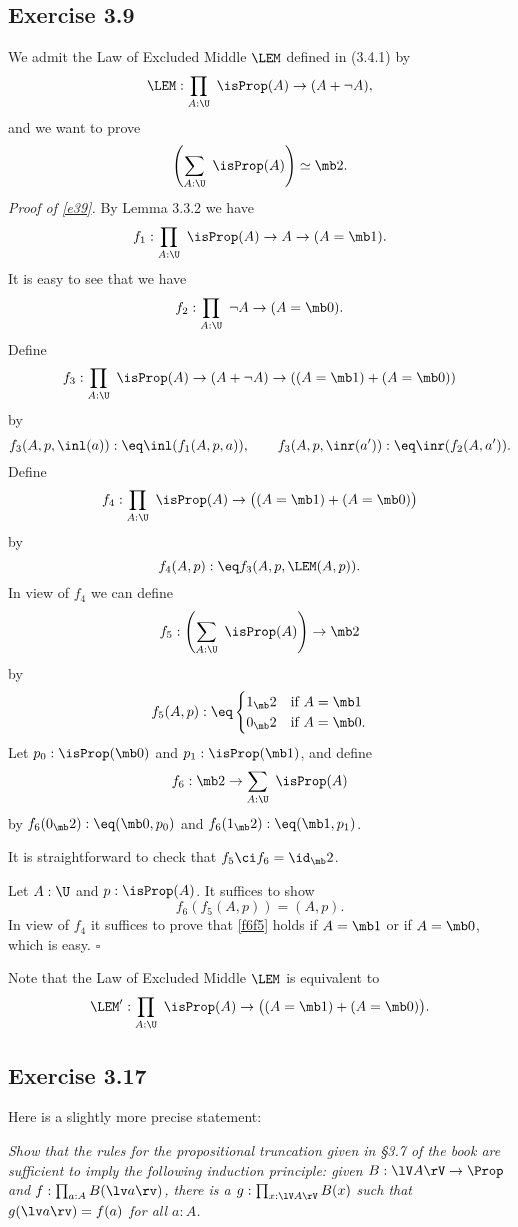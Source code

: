 \documentclass[12pt]{article}
\begin{document}

\subsection{Exercise 3.9}

We admit the Law of Excluded Middle $\LEM$ defined in (3.4.1) by 
$$
\LEM:\prod_{A:\U}\ \isProp(A)\to(A+\neg A),
$$ 
and we want to prove 
\begin{equation}\label{e39}
\left(\sum_{A:\U}\ \isProp(A)\right)\simeq\mb2.
\end{equation}
\emph{Proof of \eqref{e39}.} By Lemma 3.3.2 we have 
$$
f_1:\prod_{A:\U}\ \isProp(A)\to A\to(A=\mb1). 
$$ 
It is easy to see that we have 
$$
f_2:\prod_{A:\U}\ \neg A\to(A=\mb0). 
$$ 
Define 
$$
f_3:\prod_{A:\U}\ \isProp(A)\to(A+\neg A)\to((A=\mb1)+(A=\mb0))
$$ 
by 
$$
f_3(A,p,\inl(a)):\eq\inl(f_1(A,p,a)),\qquad f_3(A,p,\inr(a')):\eq\inr(f_2(A,a')).
$$ 
Define 
$$
f_4:\prod_{A:\U}\ \isProp(A)\to\big((A=\mb1)+(A=\mb0)\big)
$$ 
by 
$$
f_4(A,p):\eq f_3(A,p,\LEM(A,p)).
$$ 
In view of $f_4$ we can define 
$$
f_5:\left(\sum_{A:\U}\ \isProp(A)\right)\to\mb2
$$ 
by 
$$
f_5(A,p):\eq
\begin{cases}
1_\mb2&\text{if }A=\mb1\\
0_\mb2&\text{if }A=\mb0.
\end{cases}
$$ 
Let $p_0:\isProp(\mb0)$ and $p_1:\isProp(\mb1)$, and define 
$$
f_6:\mb2\to\sum_{A:\U}\ \isProp(A)
$$ 
by $f_6(0_\mb2):\eq(\mb0,p_0)$ and $f_6(1_\mb2):\eq(\mb1,p_1)$.

It is straightforward to check that $f_5\ci f_6=\id_\mb2$. 

Let $A:\U$ and $p:\isProp(A)$. It suffices to show 
\begin{equation}\label{f6f5}
f_6(f_5(A,p))=(A,p).
\end{equation}
In view of $f_4$ it suffices to prove that \eqref{f6f5} holds if $A=\mb1$ or if $A=\mb0$, which is easy. $\square$ 

Note that the Law of Excluded Middle $\LEM$ is equivalent to 
$$
\LEM':\prod_{A:\U}\ \isProp(A)\to\big((A=\mb1)+(A=\mb0)\big).
$$ 


\subsection{Exercise 3.17}\label{317}

Here is a slightly more precise statement:

\emph{Show that the rules for the propositional truncation given in \S3.7 of the book are sufficient to imply the following induction principle: given $B:\lV A\rV\to\Prop$ and $f:\prod_{a:A}B(\lv a\rv)$, there is a $g:\prod_{x:\lV A\rV}B(x)$ such that $g(\lv a\rv)=f(a)$ for all $a:A$.}
\end{document}
